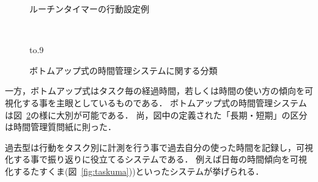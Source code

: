 \documentclass[submit,techrep,noauthor]{ipsj}
\begin{document}
\begin{figure}[hb]
	\begin{center}
		\caption{ルーチンタイマーの行動設定例}
		\label{fig:routine}
	\end{center}
\end{figure}

\begin{figure}[tb]
\vbox{\large
\hbox{\
}}
\centerline{{\hbox to.9\textwidth{\hss\box0\hss}}}
\caption{ボトムアップ式の時間管理システムに関する分類}
\label{fig:bottomup}
\end{figure}

一方，ボトムアップ式はタスク毎の経過時間，若しくは時間の使い方の傾向を可視化する事を主眼としているものである．
ボトムアップ式の時間管理システムは図~\ref{fig:bottomup}の様に大別が可能である．
尚，図中の定義された「長期・短期」の区分は時間管理質問紙\cite{Britton1991}に則った．

過去型は行動をタスク別に計測を行う事で過去自分の使った時間を記録し，可視化する事で振り返りに役立てるシステムである．
例えば日毎の時間傾向を可視化するたすくま(図~\ref{fig:taskuma}))といったシステムが挙げられる．
\end{document}
